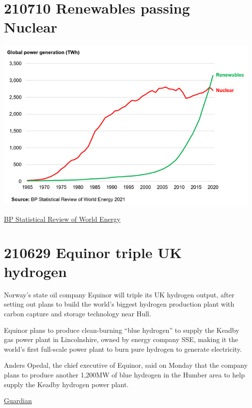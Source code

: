 \documentclass[
]{book}
\begin{document}
\hypertarget{renewables-passing-nuclear}{%
\section{210710 Renewables passing Nuclear}\label{renewables-passing-nuclear}}

\includegraphics{fig/renewables_passing_nuclear.png}

\href{https://www.bp.com/en/global/corporate/energy-economics/statistical-review-of-world-energy.html}{BP Statistical Review of World Energy}

\hypertarget{equinor-triple-uk-hydrogen}{%
\section{210629 Equinor triple UK hydrogen}\label{equinor-triple-uk-hydrogen}}

Norway's state oil company Equinor will triple its UK hydrogen output, after setting out plans to build the world's biggest hydrogen production plant with carbon capture and storage technology near Hull.

Equinor plans to produce clean-burning ``blue hydrogen'' to supply the Keadby gas power plant in Lincolnshire, owned by energy company SSE, making it the world's first full-scale power plant to burn pure hydrogen to generate electricity.

Anders Opedal, the chief executive of Equinor, said on Monday that the company plans to produce another 1,200MW of blue hydrogen in the Humber area to help supply the Keadby hydrogen power plant.

\href{https://www.theguardian.com/business/2021/jun/29/equinor-to-triple-uk-hydrogen-output-with-new-plant-near-hull}{Guardian}
\end{document}
